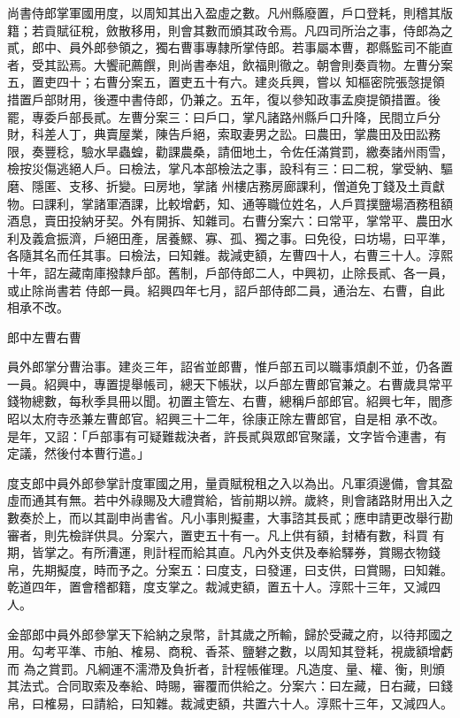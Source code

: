 \begin{pinyinscope}
 尚書侍郎掌軍國用度，以周知其出入盈虛之數。凡州縣廢置，戶口登耗，則稽其版籍；若貢賦征稅，斂散移用，則會其數而頒其政令焉。凡四司所治之事，侍郎為之貳，郎中、員外郎參領之，獨右曹事專隸所掌侍郎。若事屬本曹，郡縣監司不能直者，受其訟焉。大饗祀薦饌，則尚書奉俎，飲福則徹之。朝會則奏貢物。左曹分案五，置吏四十；右曹分案五，置吏五十有六。建炎兵興，嘗以
 知樞密院張愨提領措置戶部財用，後遷中書侍郎，仍兼之。五年，復以參知政事孟庾提領措置。後罷，專委戶部長貳。左曹分案三：曰戶口，掌凡諸路州縣戶口升降，民間立戶分財，科差人丁，典賣屋業，陳告戶絕，索取妻男之訟。曰農田，掌農田及田訟務限，奏豐稔，驗水旱蟲蝗，勸課農桑，請佃地土，令佐任滿賞罰，繳奏諸州雨雪，檢按災傷逃絕人戶。曰檢法，掌凡本部檢法之事，設科有三：曰二稅，掌受納、驅磨、隱匿、支移、折變。曰房地，掌諸
 州樓店務房廊課利，僧道免丁錢及土貢獻物。曰課利，掌諸軍酒課，比較增虧，知、通等職位姓名，人戶買撲鹽場酒務租額酒息，賣田投納牙契。外有開拆、知雜司。右曹分案六：曰常平，掌常平、農田水利及義倉振濟，戶絕田產，居養鰥、寡、孤、獨之事。曰免役，曰坊場，曰平準，各隨其名而任其事。曰檢法，曰知雜。裁減吏額，左曹四十人，右曹三十人。淳熙十年，詔左藏南庫撥隸戶部。舊制，戶部侍郎二人，中興初，止除長貳、各一員，或止除尚書若
 侍郎一員。紹興四年七月，詔戶部侍郎二員，通治左、右曹，自此相承不改。



 郎中左曹右曹



 員外郎掌分曹治事。建炎三年，詔省並郎曹，惟戶部五司以職事煩劇不並，仍各置一員。紹興中，專置提舉帳司，總天下帳狀，以戶部左曹郎官兼之。右曹歲具常平錢物總數，每秋季具冊以聞。初置主管左、右曹，總稱戶部郎官。紹興七年，閻彥昭以太府寺丞兼左曹郎官。紹興三十二年，徐康正除左曹郎官，自是相
 承不改。是年，又詔：「戶部事有可疑難裁決者，許長貳與眾郎官聚議，文字皆令連書，有定議，然後付本曹行遣。」



 度支郎中員外郎參掌計度軍國之用，量貢賦稅租之入以為出。凡軍須邊備，會其盈虛而通其有無。若中外祿賜及大禮賞給，皆前期以辨。歲終，則會諸路財用出入之數奏於上，而以其副申尚書省。凡小事則擬畫，大事諮其長貳；應申請更改舉行勘審者，則先檢詳供具。分案六，置吏五十有一。凡上供有額，封樁有數，科買
 有期，皆掌之。有所漕運，則計程而給其直。凡內外支供及奉給驛券，賞賜衣物錢帛，先期擬度，時而予之。分案五：曰度支，曰發運，曰支供，曰賞賜，曰知雜。乾道四年，置會稽都籍，度支掌之。裁減吏額，置五十人。淳熙十三年，又減四人。



 金部郎中員外郎參掌天下給納之泉幣，計其歲之所輸，歸於受藏之府，以待邦國之用。勾考平準、市舶、榷易、商稅、香茶、鹽礬之數，以周知其登耗，視歲額增虧而
 為之賞罰。凡綱運不濡滯及負折者，計程帳催理。凡造度、量、權、衡，則頒其法式。合同取索及奉給、時賜，審覆而供給之。分案六：曰左藏，日右藏，曰錢帛，曰榷易，曰請給，曰知雜。裁減吏額，共置六十人。淳熙十三年，又減四人。




\end{pinyinscope}
